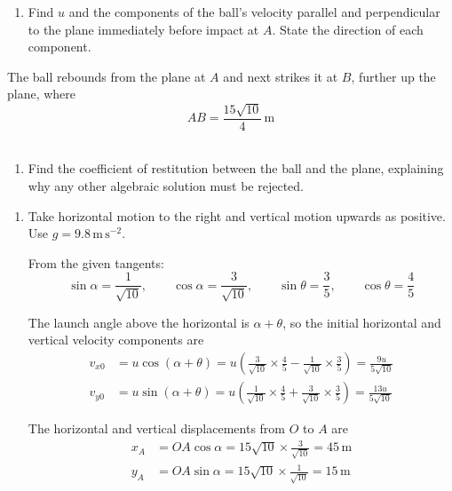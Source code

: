 \documentclass[leqno]{article}
\begin{document}
\begin{enumerate}[
  label=\textbf{\arabic*.},
  leftmargin=*,
  topsep=0pt,
  partopsep=0pt,
  parsep=0pt
]
\begin{enumerate}[label=\textbf{(\alph*)}]
\item Find $u$ and the components of the ball's velocity parallel and perpendicular to the plane immediately before impact at $A$. State the direction of each component.  \\
\end{enumerate}
The ball rebounds from the plane at $A$ and next strikes it at $B$, further up the plane, where
\[
AB=\frac{15\sqrt{10}}{4}\,\mathrm{m}
\] \\
\begin{enumerate}[label=\textbf{(\alph*)}, resume]
\item Find the coefficient of restitution between the ball and the plane, explaining why any other algebraic solution must be rejected.  \\
\end{enumerate}

\vspace*{10pt}

\begin{djsSolution}
\begin{enumerate}[label=\textbf{(\alph*)}, start=1]
\item Take horizontal motion to the right and vertical motion upwards as positive. Use \(g=9.8\,\mathrm{m\,s^{-2}}\).

From the given tangents:
\[
\sin\alpha=\frac{1}{\sqrt{10}},\qquad \cos\alpha=\frac{3}{\sqrt{10}},\qquad
\sin\theta=\frac35,\qquad \cos\theta=\frac45
\]

The launch angle above the horizontal is \(\alpha+\theta\), so the initial horizontal and vertical velocity components are
\begin{align*}
v_{x0}&=u\cos(\alpha+\theta)
=u\left(\frac{3}{\sqrt{10}}\times\frac45-\frac{1}{\sqrt{10}}\times\frac35\right)
=\frac{9u}{5\sqrt{10}}\\
v_{y0}&=u\sin(\alpha+\theta)
=u\left(\frac{1}{\sqrt{10}}\times\frac45+\frac{3}{\sqrt{10}}\times\frac35\right)
=\frac{13u}{5\sqrt{10}}
\end{align*}

The horizontal and vertical displacements from \(O\) to \(A\) are
\begin{align*}
x_A&=OA\cos\alpha=15\sqrt{10}\times\frac{3}{\sqrt{10}}=45\,\mathrm{m}\\
y_A&=OA\sin\alpha=15\sqrt{10}\times\frac{1}{\sqrt{10}}=15\,\mathrm{m}
\end{align*}


\end{enumerate}
\end{djsSolution}
\end{enumerate}
\end{document}
